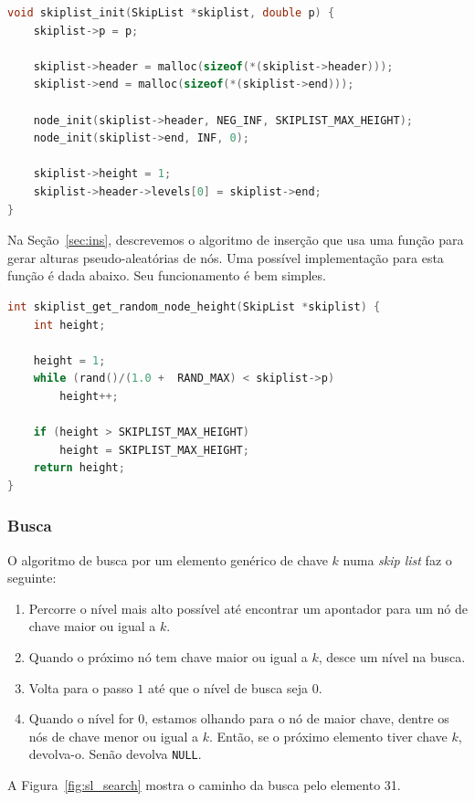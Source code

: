 \documentclass[paper=a4, fontsize=11pt]{scrartcl} %
\numberwithin{equation}{section}
\numberwithin{figure}{section}
\numberwithin{table}{section}
\numberwithin{definition}{section}
\numberwithin{theorem}{section}
\numberwithin{property}{section}
\numberwithin{proposition}{section}
\newcommand{\skl}{\textit{skip list}\xspace}
\begin{document}
\begin{lstlisting}[caption=Inicialização de uma skip list., language=C]
void skiplist_init(SkipList *skiplist, double p) {
    skiplist->p = p;

    skiplist->header = malloc(sizeof(*(skiplist->header)));
    skiplist->end = malloc(sizeof(*(skiplist->end)));

    node_init(skiplist->header, NEG_INF, SKIPLIST_MAX_HEIGHT);
    node_init(skiplist->end, INF, 0);

    skiplist->height = 1;
    skiplist->header->levels[0] = skiplist->end;
}
\end{lstlisting}

Na Seção~\ref{sec:ins}, descrevemos o algoritmo de inserção que usa uma função para gerar alturas pseudo-aleatórias de nós. Uma
possível implementação para esta função é dada abaixo. 
Seu funcionamento é bem simples.

\begin{lstlisting}[caption=Geração de alturas., language=C]
int skiplist_get_random_node_height(SkipList *skiplist) {
    int height;

    height = 1;
    while (rand()/(1.0 +  RAND_MAX) < skiplist->p)
        height++;

    if (height > SKIPLIST_MAX_HEIGHT)
        height = SKIPLIST_MAX_HEIGHT;
    return height;
}
\end{lstlisting}

\FloatBarrier
\subsubsection{Busca}

O algoritmo de busca por um elemento genérico de chave $k$ numa \skl faz o seguinte:
\begin{enumerate}
  \item Percorre o nível mais alto possível até encontrar um apontador para um nó de chave maior ou igual
a $k$.
  \item Quando o próximo nó tem chave maior ou igual a $k$, desce um nível na busca.
  \item Volta para o passo $1$ até que o nível de busca seja $0$.
  \item Quando o nível for $0$, estamos olhando para o nó de maior chave, dentre os nós de chave 
  menor ou igual a $k$. Então, se o próximo elemento tiver chave $k$, devolva-o. Senão devolva \verb|NULL|.
\end{enumerate}

A Figura~\ref{fig:sl_search} mostra o caminho da busca pelo elemento 31.
\end{document}

